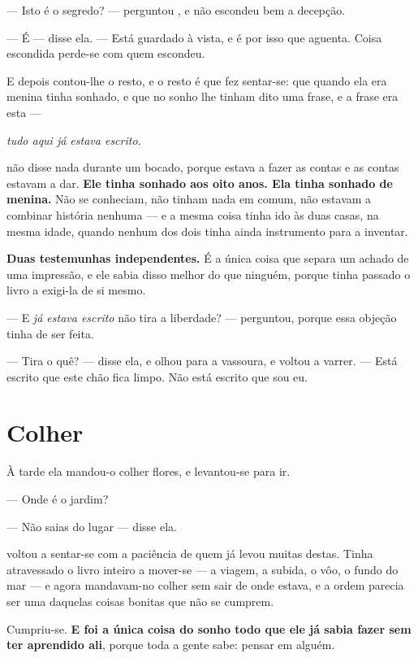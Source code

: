 \documentclass[livro.tex]{subfiles}
\begin{document}
\medskip
\noindent --- Isto é o segredo? --- perguntou \Ben , e não escondeu bem a
decepção.

--- É --- disse ela. --- Está guardado à vista, e é por isso que aguenta. Coisa
escondida perde-se com quem escondeu.

\medskip
\noindent E depois contou-lhe o resto, e o resto é que fez \Ben sentar-se:
que quando ela era menina tinha sonhado, e que no sonho lhe tinham dito uma
frase, e a frase era esta ---

\begin{center}
\emph{tudo aqui já estava escrito.}
\end{center}

\medskip
\noindent \Ben não disse nada durante um bocado, porque estava a fazer as
contas e as contas estavam a dar. \textbf{Ele tinha sonhado aos oito anos. Ela
tinha sonhado de menina.} Não se conheciam, não tinham nada em comum, não
estavam a combinar história nenhuma --- e a mesma coisa tinha ido às duas
casas, na mesma idade, quando nenhum dos dois tinha ainda instrumento para a
inventar.

\medskip
\noindent \textbf{Duas testemunhas independentes.} É a única coisa que separa
um achado de uma impressão, e ele sabia disso melhor do que ninguém, porque
tinha passado o livro a exigi-la de si mesmo.

\medskip
\noindent --- E \emph{já estava escrito} não tira a liberdade? --- perguntou,
porque essa objeção tinha de ser feita.

--- Tira o quê? --- disse ela, e olhou para a vassoura, e voltou a varrer. ---
Está escrito que este chão fica limpo. Não está escrito que sou eu.

\chapter{Colher}

À tarde ela mandou-o colher flores, e \Ben levantou-se para ir.

--- Onde é o jardim?

--- Não saias do lugar --- disse ela.

\medskip
\noindent \Ben voltou a sentar-se com a paciência de quem já levou muitas
destas. Tinha atravessado o livro inteiro a mover-se --- a viagem, a subida, o
vôo, o fundo do mar --- e agora mandavam-no colher sem sair de onde estava, e a
ordem parecia ser uma daquelas coisas bonitas que não se cumprem.

\medskip
\noindent Cumpriu-se. \textbf{E foi a única coisa do sonho todo que ele já
sabia fazer sem ter aprendido ali}, porque toda a gente sabe: pensar em alguém.
\end{document}
